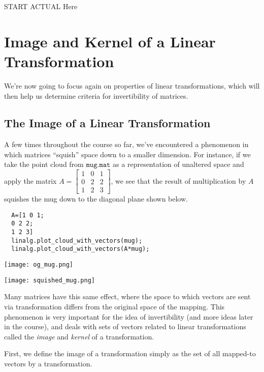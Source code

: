 \documentclass{ximera}
\begin{document}
START ACTUAL Here


\section*{Image and Kernel of a Linear Transformation}

We're now going to focus again on properties of linear transformations, which will then help us determine criteria for invertibility of matrices.

\subsection*{The Image of a Linear Transformation}

A few times throughout the course so far, we've encountered a phenomenon in which matrices ``squish'' space down to a smaller dimension. For instance, if we take the point cloud from $\texttt{mug.mat}$ as a representation of unaltered space and apply the matrix $A=\begin{bmatrix}
  1&0&1\\0&2&2\\1&2&3
\end{bmatrix}$, we see that the result of multiplication by $A$ squishes the mug down to the diagonal plane shown below. 

\begin{verbatim}
  A=[1 0 1;
  0 2 2;
  1 2 3]
  linalg.plot_cloud_with_vectors(mug);
  linalg.plot_cloud_with_vectors(A*mug);
\end{verbatim}



\begin{center}
  \texttt{[image: og\_mug.png]}
\end{center}

\begin{center}
  \texttt{[image: squished\_mug.png]}
\end{center}



Many matrices have this same effect, where the space to which vectors are sent via transformation differs from the original space of the mapping. This phenomenon is very important for the idea of invertibility (and more ideas later in the course), and deals with sets of vectors related to linear transformations called the \emph{image} and \emph{kernel} of a transformation.

First, we define the image of a transformation simply as the set of all mapped-to vectors by a transformation.
\end{document}
